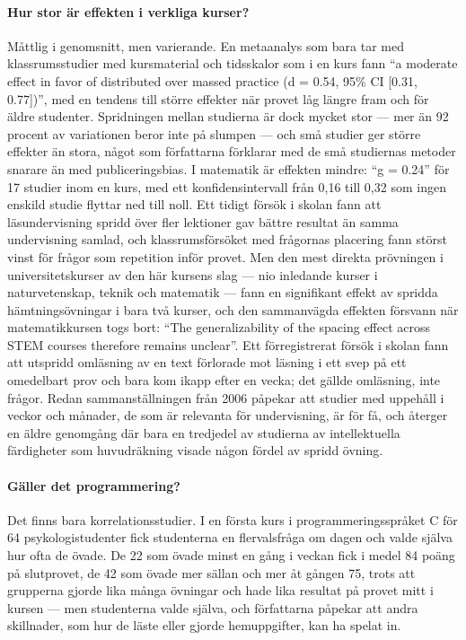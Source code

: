 \paragraph{Hur stor är effekten i verkliga kurser?}
Måttlig i genomsnitt, men varierande.  En metaanalys som bara tar med
klassrumsstudier med kursmaterial och tidsskalor som i en kurs fann
\enquote{a moderate effect in favor of distributed over massed practice
(d = 0.54, 95\% CI [0.31, 0.77])}, med en tendens till större effekter
när provet låg längre fram och för äldre
studenter\autocite{Mawson2025Classroom}.
Spridningen mellan studierna är dock mycket stor --- mer än 92 procent av
variationen beror inte på slumpen --- och små studier ger större
effekter än stora, något som författarna förklarar med de små studiernas
metoder snarare än med publiceringsbias\autocite{Mawson2025Classroom}.
I matematik är effekten mindre: \enquote{g = 0.24} för 17 studier inom
en kurs, med ett konfidensintervall från 0,16 till 0,32 som ingen enskild
studie flyttar ned till noll\autocite[14, 20]{Murray2025Mathematics}.
Ett tidigt försök i skolan fann att
läsundervisning spridd över fler lektioner gav bättre resultat än samma
undervisning samlad\autocite{Seabrook2005Distributed}, och
klassrumsförsöket med frågornas placering fann störst vinst för frågor
som repetition inför provet\autocite{McDaniel2011Quiz}.  Men den mest
direkta prövningen i universitetskurser av den här kursens slag --- nio
inledande kurser i naturvetenskap, teknik och matematik --- fann en
signifikant effekt av spridda hämtningsövningar i bara två kurser, och
den sammanvägda effekten försvann när matematikkursen togs bort:
\enquote{The generalizability of the spacing effect across STEM courses
therefore remains unclear}\autocite{Bego2024Spaced}.  Ett förregistrerat
försök i skolan fann att utspridd omläsning av en text förlorade mot
läsning i ett svep på ett omedelbart prov och bara kom ikapp efter en
vecka\autocite{GrevingRichter2019}; det gällde omläsning, inte frågor.  Redan
sammanställningen från 2006 påpekar att studier med uppehåll i veckor
och månader, de som är relevanta för undervisning, är för få, och
återger en äldre genomgång där bara en tredjedel av studierna av
intellektuella färdigheter som huvudräkning visade någon fördel av
spridd övning\autocite[355]{Cepeda2006Distributed}.

\paragraph{Gäller det programmering?}
Det finns bara korrelationsstudier.  I en första kurs i programmeringsspråket
C för 64 psykologistudenter fick studenterna en flervalsfråga om dagen
och valde själva hur ofta de övade.  De 22 som övade minst en gång i
veckan fick i medel 84 poäng på slutprovet, de 42 som övade mer sällan
och mer åt gången 75, trots att grupperna gjorde lika många övningar och
hade lika resultat på provet mitt i kursen\autocite[242]{Zhang2020Distributed}
--- men studenterna valde själva, och författarna påpekar att andra
skillnader, som hur de läste eller gjorde hemuppgifter, kan ha spelat
in\autocite[246]{Zhang2020Distributed}.


